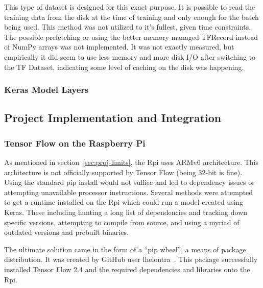 \documentclass[11pt]{article}
\begin{document}
                This type of dataset is designed for this exact purpose. It is possible to read the training data from the disk at the time of training and only enough for the batch being used. This method was not utilized to it's fullest, given time constraints. The possible prefetching or using the better memory managed TFRecord instead of NumPy arrays was not implemented. It was not exactly measured, but empirically it did seem to use less memory and more disk I/O after switching to the TF Dataset, indicating some level of caching on the disk was happening.

            \subsubsection{Keras Model Layers}

        \subsection{Project Implementation and Integration}
            \subsubsection{Tensor Flow on the Raspberry Pi}
                As mentioned in section~\ref{sec:proj-limits}, the Rpi uses ARMv6 architecture. This architecture is not officially supported by Tensor Flow (being 32-bit is fine). Using the standard pip install would not suffice and led to dependency issues or attempting unavailable processor instructions. Several methods were attempted to get a runtime installed on the Rpi which could run a model created using Keras. These including hunting a long list of dependencies and tracking down specific versions, attempting to compile from source, and using a myriad of outdated versions and prebuilt binaries. 
                
                The ultimate solution came in the form of a ``pip wheel'', a means of package distribution. It was created by GitHub user lhelontra~\cite{lontra}. This package successfully installed Tensor Flow 2.4 and the required dependencies and libraries onto the Rpi.
\end{document}
